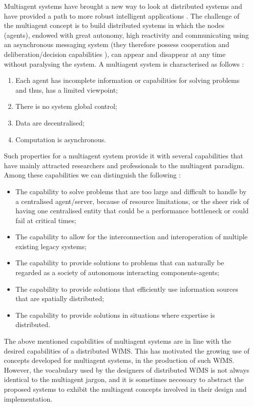 Multiagent systems have brought a new way to look at distributed systems and have provided a path to more robust intelligent applications \cite{deloach2001multiagent}. The challenge of the multiagent concept is to build distributed systems in which the nodes (agents), endowed with great autonomy, high reactivity and communicating using an asynchronous messaging system (they therefore possess cooperation and deliberation/decision capabilities \cite{theseKanzow}), can appear and disappear at any time without paralysing the system. A multiagent system is characterised as follows \cite{sycara1998multiagent}:
\begin{enumerate}
	\item Each agent has incomplete information or capabilities for solving problems and thus, has a limited viewpoint;
	\item There is no system global control;
	\item Data are decentralised;
	\item Computation is asynchronous.
\end{enumerate}
Such properties for a multiagent system provide it with several capabilities that have mainly attracted researchers and professionals to the multiagent paradigm. Among these capabilities we can distinguish the following \cite{sycara1998multiagent}: 
\begin{itemize}
	\item The capability to solve problems that are too large and difficult to handle by a centralised agent/server, because of resource limitations, or the sheer risk of having one centralised entity that could be a performance bottleneck or could fail at critical times;
	\item The capability to allow for the interconnection and interoperation of multiple existing legacy systems;
	\item The capability to provide solutions to problems that can naturally be regarded as a society of autonomous interacting components-agents;
	\item The capability to provide solutions that efficiently use information sources that are spatially distributed;
	\item The capability to provide solutions in situations	where expertise is distributed.
\end{itemize}

The above mentioned capabilities of multiagent systems are in line with the desired capabilities of a distributed WfMS. This has motivated the growing use of concepts developed for multiagent systems, in the production of such WfMS. However, the vocabulary used by the designers of distributed WfMS is not always identical to the multiagent jargon, and it is sometimes necessary to abstract the proposed systems to exhibit the multiagent concepts involved in their design and implementation.



